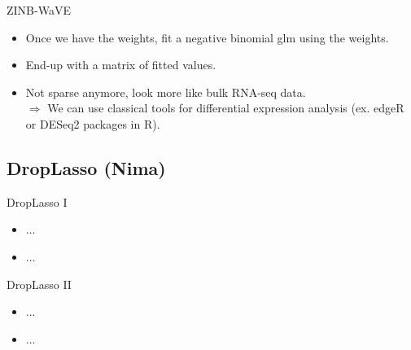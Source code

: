 \documentclass{beamer}
\begin{document}

\begin{frame}{ZINB-WaVE}

\begin{itemize}
  \itemsep10pt
  \item Once we have the weights, fit a negative binomial glm using the weights.
  \item End-up with a matrix of fitted values.
  \item Not sparse anymore, look more like bulk RNA-seq data.\\
  $\Longrightarrow$ We can use classical tools for differential expression analysis (ex. edgeR or DESeq2 packages in R).
\end{itemize}

\end{frame}

\subsection{DropLasso (Nima)}

\begin{frame}{DropLasso I}

\begin{itemize}
  \itemsep10pt
  \item ...
  \item ...
\end{itemize}

\end{frame}


\begin{frame}{DropLasso II}

\begin{itemize}
  \itemsep10pt
  \item ...
  \item ...
\end{itemize}

\end{frame}

\end{document}
